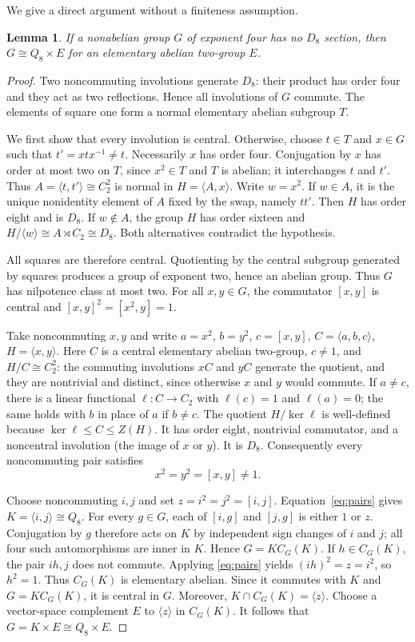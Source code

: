 \documentclass[11pt]{article}
\newtheorem{lemma}{Lemma}
\begin{document}
We give a direct argument without a finiteness assumption.

\begin{lemma}\label{lem:structure}
If a nonabelian group $G$ of exponent four has no $D_8$ section, then
$G\cong Q_8\times E$ for an elementary abelian two-group $E$.
\end{lemma}
\begin{proof}
Two noncommuting involutions generate $D_8$: their product has order
four and they act as two reflections. Hence all involutions of $G$
commute. The elements of square one form a normal elementary abelian
subgroup $T$.

We first show that every involution is central. Otherwise, choose
$t\in T$ and $x\in G$ such that $t'=xtx^{-1}\ne t$. Necessarily $x$
has order four. Conjugation by $x$ has order at most two on $T$, since
$x^2\in T$ and $T$ is abelian; it interchanges $t$ and $t'$. Thus
$A=\langle t,t'\rangle\cong C_2^2$ is normal in $H=\langle A,x\rangle$.
Write $w=x^2$. If $w\in A$, it is the unique nonidentity element of
$A$ fixed by the swap, namely $tt'$. Then $H$ has order eight and is
$D_8$. If $w\notin A$, the group $H$ has order sixteen and
$H/\langle w\rangle\cong A\rtimes C_2\cong D_8$. Both alternatives
contradict the hypothesis.

All squares are therefore central. Quotienting by the central subgroup
generated by squares produces a group of exponent two, hence an abelian
group. Thus $G$ has nilpotence class at most two. For all $x,y\in G$,
the commutator $[x,y]$ is central and
$[x,y]^2=[x^2,y]=1$.

Take noncommuting $x,y$ and write
$a=x^2$, $b=y^2$, $c=[x,y]$, $C=\langle a,b,c\rangle$,
$H=\langle x,y\rangle$. Here $C$ is a central elementary abelian
two-group, $c\ne1$, and $H/C\cong C_2^2$: the commuting involutions $xC$ and $yC$ generate
the quotient, and they are nontrivial and distinct, since otherwise
$x$ and $y$ would commute. If $a\ne c$, there is a linear functional
$\ell:C\to C_2$ with $\ell(c)=1$ and $\ell(a)=0$; the same holds
with $b$ in place of $a$ if $b\ne c$. The quotient
$H/\ker\ell$ is well-defined because $\ker\ell\leq C\leq Z(H)$.
It has order eight, nontrivial commutator, and a
noncentral involution (the image of $x$ or $y$). It is $D_8$.
Consequently every noncommuting pair satisfies
\begin{equation}\label{eq:pairs}
                     x^2=y^2=[x,y]\ne1.
\end{equation}

Choose noncommuting $i,j$ and set $z=i^2=j^2=[i,j]$.
Equation~\eqref{eq:pairs} gives
$K=\langle i,j\rangle\cong Q_8$. For every $g\in G$, each of
$[i,g]$ and $[j,g]$ is either $1$ or $z$. Conjugation by $g$ therefore
acts on $K$ by independent sign changes of $i$ and $j$; all four such
automorphisms are inner in $K$. Hence $G=K C_G(K)$.
If $h\in C_G(K)$, the pair $ih,j$ does not commute. Applying
\eqref{eq:pairs} yields $(ih)^2=z=i^2$, so $h^2=1$.
Thus $C_G(K)$ is elementary abelian. Since it commutes with $K$ and
$G=K C_G(K)$, it is central in $G$. Moreover,
$K\cap C_G(K)=\langle z\rangle$. Choose a vector-space complement
$E$ to $\langle z\rangle$ in $C_G(K)$. It follows that
$G=K\times E\cong Q_8\times E$.
\end{proof}
\end{document}
